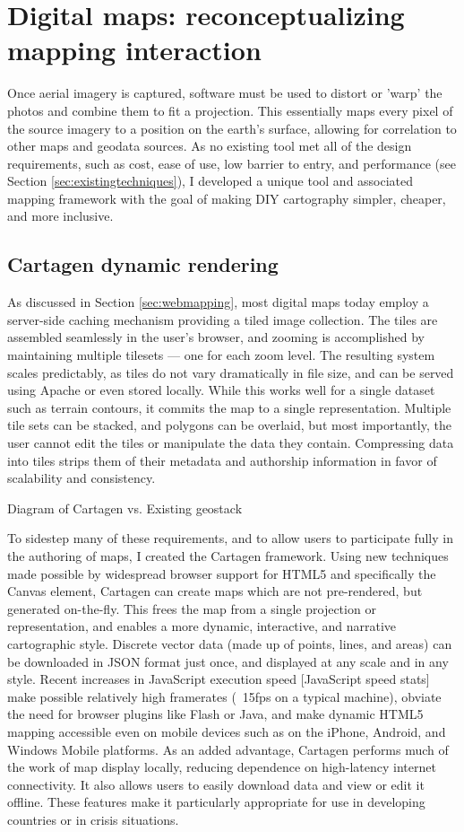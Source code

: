 \documentclass[11pt]{report}
\begin{document}
\section{Digital maps: reconceptualizing mapping interaction}

Once aerial imagery is captured, software must be used to distort or 'warp' the photos and combine them to fit a projection. This essentially maps every pixel of the source imagery to a position on the earth's surface, allowing for correlation to other maps and geodata sources. As no existing tool met all of the design requirements, such as cost, ease of use, low barrier to entry, and performance (see Section \ref{sec:existingtechniques}), I developed a unique tool and associated mapping framework with the goal of making DIY cartography simpler, cheaper, and more inclusive.

\subsection{Cartagen dynamic rendering}

As discussed in Section \ref{sec:webmapping}, most digital maps today employ a server-side caching mechanism providing a tiled image collection. The tiles are assembled seamlessly in the user's browser, and zooming is accomplished by maintaining multiple tilesets --- one for each zoom level. The resulting system scales predictably, as tiles do not vary dramatically in file size, and can be served using Apache or even stored locally. While this works well for a single dataset such as terrain contours, it commits the map to a single representation. Multiple tile sets can be stacked, and polygons can be overlaid, but most importantly, the user cannot edit the tiles or manipulate the data they contain. Compressing data into tiles strips them of their metadata and authorship information in favor of scalability and consistency. 

Diagram of Cartagen vs. Existing geostack

To sidestep many of these requirements, and to allow users to participate fully in the authoring of maps, I created the Cartagen framework. Using new techniques made possible by widespread browser support for HTML5 and specifically the Canvas element, Cartagen can create maps which are not pre-rendered, but generated on-the-fly. This frees the map from a single projection or representation, and enables a more dynamic, interactive, and narrative cartographic style. Discrete vector data (made up of points, lines, and areas) can be downloaded in JSON format just once, and displayed at any scale and in any style. Recent increases in JavaScript execution speed [JavaScript speed stats] make possible relatively high framerates (~15fps on a typical machine), obviate the need for browser plugins like Flash or Java, and make dynamic HTML5 mapping accessible even on mobile devices such as on the iPhone, Android, and Windows Mobile platforms. As an added advantage, Cartagen performs much of the work of map display locally, reducing dependence on high-latency internet connectivity. It also allows users to easily download data and view or edit it offline. These features make it particularly appropriate for use in developing countries or in crisis situations. 
\end{document}
